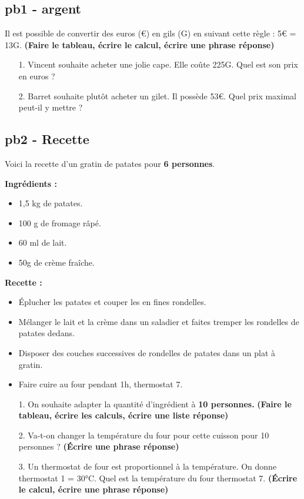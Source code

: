 \documentclass[11pt]{article}
\begin{document}
\subsection*{pb1 - argent}
Il est possible de convertir des euros (€) en gils (G) en suivant cette règle : 5€ = 13G.
\textbf{(Faire le tableau, écrire le calcul, écrire une phrase réponse)}

\begin{enumerate}
  \item[1.] Vincent souhaite acheter une jolie cape. Elle coûte 225G. Quel est son prix en euros ? 
  \item[2.] Barret souhaite plutôt acheter un gilet. Il possède 53€. Quel prix maximal peut-il y mettre ?
\end{enumerate}

\subsection*{pb2 - Recette}
Voici la recette d'un gratin de patates pour \textbf{6 personnes}. 

\begin{minipage}[t]{0.45\textwidth}
  \textbf{Ingrédients : }
  \begin{itemize}
    \item 1,5 kg de patates.
    \item 100 g de fromage râpé.
    \item 60 ml de lait.
    \item 50g de crème fraîche.
  \end{itemize}

\end{minipage}
\begin{minipage}[t]{0.5\textwidth}
  \textbf{Recette :}
  \begin{itemize}
    \item Éplucher les patates et couper les en fines rondelles.
    \item Mélanger le lait et la crème dans un saladier et faites tremper les rondelles de patates dedans.
    \item Disposer des couches successives de rondelles de patates dans un plat à gratin. 
    \item Faire cuire au four pendant 1h, thermostat 7.
  \end{itemize}
\end{minipage}

\begin{enumerate}
  \item[1.] On souhaite adapter la quantité d'ingrédient à \textbf{10 personnes.} \textbf{(Faire le tableau, écrire les calculs, écrire une liste réponse)}
  \item[2.] Va-t-on changer la température du four pour cette cuisson pour 10 personnes ?  \textbf{(Écrire une phrase réponse)}
  \item[3.] Un thermostat de four est proportionnel à la température. On donne thermostat 1 = 30°C. Quel est la température du four thermostat 7. \textbf{(Écrire le calcul, écrire une phrase réponse)} 
\end{enumerate}
\end{document}
